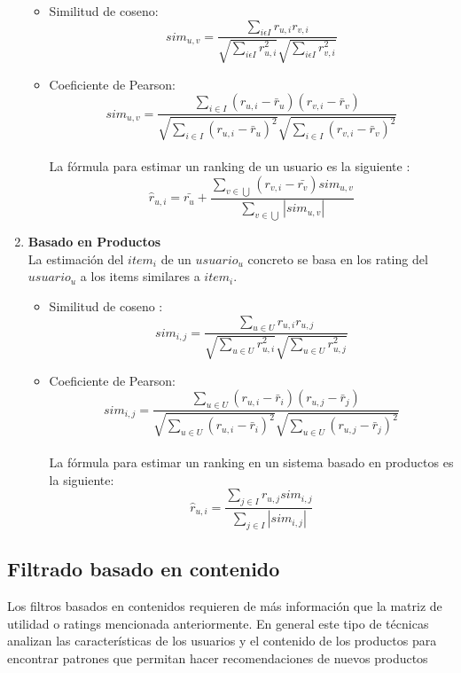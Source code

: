 \begin{enumerate}
\begin{itemize}
\item Similitud de coseno:\\\begin{equation}sim_{u,v}=\frac{\sum_{i\epsilon I}r_{u,i}r_{v,i}}{\sqrt{\sum_{i\epsilon I}r_{u,i}^{2}}\sqrt{\sum_{i\epsilon I}r_{v,i}^{2}}}
\end{equation}
\item Coeficiente de Pearson:\\ \begin{equation}sim_{u,v}=\frac{\sum_{i \in I}(r_{u,i}-\bar{r}_{u}) (r_{v,i}-\bar{r}_{v})}{\sqrt{\sum_{i \in I}(r_{u,i}-\bar{r}_{u})^{2}} \sqrt{\sum_{i \in I}(r_{v,i} - \bar{r}_{v})^{2}}}
\end{equation}
 \\La fórmula para estimar un ranking de un usuario es la siguiente : \begin{equation}
\hat{r}_{u,i}= \bar{r_{u}}+\frac{\sum_{v\in \bigcup }(r_{v,i}-\bar{r_{v}})sim_{u,v}}{\sum_{v\in \bigcup } \left | sim_{u,v} \right |} 
\end{equation}
\end{itemize}
\item \textbf{Basado en Productos}\\La estimación del  $item_{i}$ de un $usuario_{u}$ concreto se basa en los rating del $usuario_{u}$ a los items similares a $item_{i}$.\\ \begin{itemize}
\item Similitud de coseno : \\ \begin{equation}
sim_{i,j }=\frac{\sum_{u\in U}r_{u,i}r_{u,j}}{\sqrt{\sum_{u\in U}r^{2}_{u,i}}\sqrt{\sum_{u\in U}r^{2}_{u,j}}}
\end{equation}
\item Coeficiente de Pearson: \\ \begin{equation}
sim_{i,j}=\frac{\sum_{u \in U}(r_{u,i}-\bar{r}_{i}) (r_{u,j}-\bar{r}_{j})}{\sqrt{\sum_{u \in U}(r_{u,i}-\bar{r}_{i})^{2}} \sqrt{\sum_{u \in U}(r_{u,j} - \bar{r}_{j})^{2}}}
\end{equation} \\La fórmula para estimar un ranking en un sistema basado en productos es la siguiente:\nocite{ubu:recomendacion} \\ \begin{equation}
\hat{r}_{u,i}= \frac{\sum_{j\in I }r_{u,j}sim_{i,j}}{\sum_{j\in I } \left | sim_{i,j} \right |} 
\end{equation}
\end{itemize}
\end{enumerate}


\subsection{Filtrado basado en contenido}
Los filtros basados en contenidos requieren de más información que la matriz de utilidad o ratings mencionada anteriormente. En general este tipo de técnicas analizan las características de los usuarios y el contenido de los productos para encontrar patrones que permitan hacer recomendaciones de nuevos productos
 
